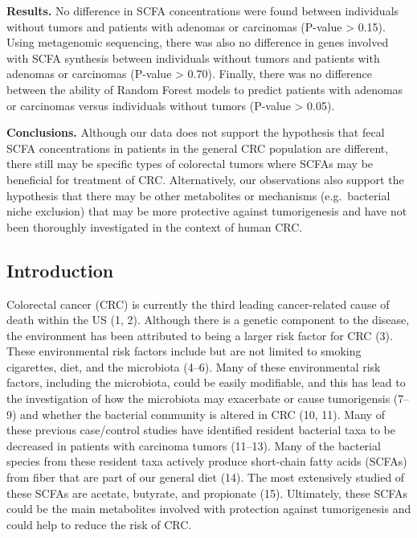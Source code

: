 \documentclass[11pt,]{article}
\begin{document}
\textbf{Results.} No difference in SCFA concentrations were found
between individuals without tumors and patients with adenomas or
carcinomas (P-value \textgreater{} 0.15). Using metagenomic sequencing,
there was also no difference in genes involved with SCFA synthesis
between individuals without tumors and patients with adenomas or
carcinomas (P-value \textgreater{} 0.70). Finally, there was no
difference between the ability of Random Forest models to predict
patients with adenomas or carcinomas versus individuals without tumors
(P-value \textgreater{} 0.05).

\textbf{Conclusions.} Although our data does not support the hypothesis
that fecal SCFA concentrations in patients in the general CRC population
are different, there still may be specific types of colorectal tumors
where SCFAs may be beneficial for treatment of CRC. Alternatively, our
observations also support the hypothesis that there may be other
metabolites or mechanisms (e.g.~bacterial niche exclusion) that may be
more protective against tumorigenesis and have not been thoroughly
investigated in the context of human CRC.

\newpage

\subsection{Introduction}\label{introduction}

Colorectal cancer (CRC) is currently the third leading cancer-related
cause of death within the US (1, 2). Although there is a genetic
component to the disease, the environment has been attributed to being a
larger risk factor for CRC (3). These environmental risk factors include
but are not limited to smoking cigarettes, diet, and the microbiota
(4--6). Many of these environmental risk factors, including the
microbiota, could be easily modifiable, and this has lead to the
investigation of how the microbiota may exacerbate or cause tumorigensis
(7--9) and whether the bacterial community is altered in CRC (10, 11).
Many of these previous case/control studies have identified resident
bacterial taxa to be decreased in patients with carcinoma tumors
(11--13). Many of the bacterial species from these resident taxa
actively produce short-chain fatty acids (SCFAs) from fiber that are
part of our general diet (14). The most extensively studied of these
SCFAs are acetate, butyrate, and propionate (15). Ultimately, these
SCFAs could be the main metabolites involved with protection against
tumorigenesis and could help to reduce the risk of CRC.
\end{document}
